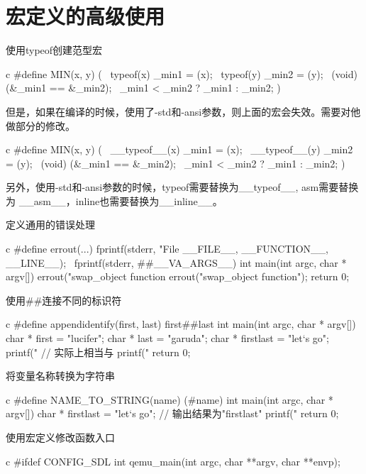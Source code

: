 \section{宏定义的高级使用}
\begin{outline}[enumerate]

\1 使用typeof创建范型宏
\begin{code-block}{c}
#define MIN(x, y) ({                \
    typeof(x) _min1 = (x);          \
    typeof(y) _min2 = (y);          \
    (void) (&_min1 == &_min2);      \
    _min1 < _min2 ? _min1 : _min2; })
\end{code-block}
但是，如果在编译的时候，使用了-std和-ansi参数，则上面的宏会失效。需要对他做部分的修改。
\begin{code-block}{c}
#define MIN(x, y) ({                    \
    __typeof__(x) _min1 = (x);          \
    __typeof__(y) _min2 = (y);          \
    (void) (&_min1 == &_min2);          \
    _min1 < _min2 ? _min1 : _min2; })
\end{code-block}
另外，使用-std和-ansi参数的时候，typeof需要替换为\_\_typeof\_\_, asm需要替换为
\_\_asm\_\_，inline也需要替换为\_\_inline\_\_。

\1 定义通用的错误处理
\begin{code-block}{c}
#define errout(...) fprintf(stderr, "File %
        __FILE__, __FUNCTION__, __LINE__);                          \
        fprintf(stderr, ##__VA_ARGS__)
int main(int argc, char * argv[])
{
    errout("swap_object function %
    errout("swap_object function\n");
    return 0;
}
\end{code-block}

\1 使用\#\#连接不同的标识符
\begin{code-block}{c}
#define appendidentify(first, last) first##last
int main(int argc, char * argv[])
{
    char * first = "lucifer";
    char * last = "garuda";
    char * firstlast = "let`s go";
    printf("%
    // 实际上相当与 printf("%
    return 0;
}
\end{code-block}

\1 将变量名称转换为字符串
\begin{code-block}{c}
#define NAME_TO_STRING(name) (#name)
int main(int argc, char * argv[])
{
    char * firstlast = "let`s go";
    // 输出结果为"firstlast"
    printf("%
    return 0;
}
\end{code-block}

\1 使用宏定义修改函数入口
\begin{code-block}{c}
#ifdef CONFIG_SDL
int qemu_main(int argc, char **argv, char **envp);


\end{code-block}
\end{outline}
